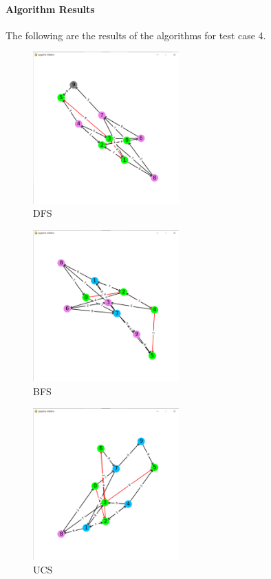 \paragraph*{Algorithm Results}

\quad The following are the results of the algorithms for test case 4.

\begin{figure}[h!]
    \centering
    \includegraphics[width=0.5\textwidth]{result/testcase4/dfs.png}
    \caption{DFS}
\end{figure}
\begin{figure}[h!]
    \centering
    \includegraphics[width=0.5\textwidth]{result/testcase4/bfs.png}
    \caption{BFS}
\end{figure}
\begin{figure}[h!]
    \centering
    \includegraphics[width=0.5\textwidth]{result/testcase4/ucs.png}
    \caption{UCS}  
\end{figure}
